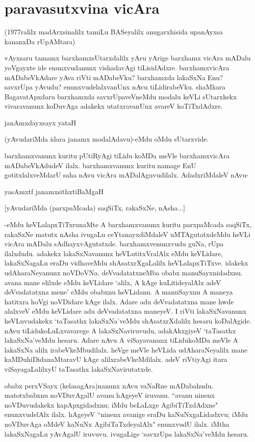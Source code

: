\chapter{paravasutxvina vicAra}\label{chap13}

(1977ralilx madArxsinalilx tamiLu BASeyalilx anugarxhisida upanAyxsa kananxDa rUpAMtara)

vAyxsaru tamamx barxhamxsUtarxdalilx yAru yArige barxhamx vicAra mADalu yoVgayxte ide enunxvudanunx vishadavAgi tiLisidAdxre. barxhamxvicAra mADabeVkAdare yAva riVti mADabeVku? barxhamxda lakaSxNa Enu? savxrUpa yAvudu? enunxvudelalxvanUnx nAvu tiLidirabeVku. shaMkara BagavatApxdaru barxhamxda savxrUpaveVneMdu modalu keVLi sUtarxkekx vivaravanunx koDuvAga adakekx utatxravanUnx avareV koTiTxdAdxre. 

janAmxdayxsayx yataH

(yAvudariMda idara janamx modalAdavu)-eMdu oMdu sUtarxvide. 

barxhamxvanunx kuritu pUtiRyAgi tiLidu koMDa meVle barxhamxvicAra mADabeVkAdudeV ilalx. barxhamxvanunx kuritu namage EnU gotitxlalxveMdarU saha nAvu vicAra mADalAguvudilalx. AdadxriMdaleV nAvu- 

yasAmxtf janamxsithxtiBaMgaH

[yAvudariMda (parxpaMcada) saqSiTx, rakaSxNe, nAsha$\ldots$]

-eMdu heVLalapxTiTxrunaMte A barxhamxvanunx kuritu parxpaMcada saqSiTx, rakaSxNe matutx nAsha ivugaLu ceYtanayxdiMdaleV uMTAgutatxdeMdu heVLi vicAra mADalu sAdhayxvAgutatxde. barxhamxvenunxvudu guNa, rUpa ilalxdudu. adakekx lakaSxNavanunx heVLutitxVralAlx eMdu keVLidare, lakaSxNagaLu eraDu vidhaveMdu shAsatxrXgaLalilx heVLalapxTiTxve. idakekx udAharaNeyanunx noVDoVNa. deVvadatatxneMba obabx manuSayxnidadxnu. avana mane elilxde eMdu keVLidare `alilx, A kAge kuLitideyalAlx adeV deVvadatatxna mene' eMdu obabxnu heVLidanu. A manuSayxnu A maneya hatitxra hoVgi noVDidare kAge ilalx. Adare adu deVvadatatxna mane hwde alalxveV eMdu keVLidare adu deVvadatatxna maneyeV. I riVti lakaSxNavanunx heVLuvudakekx `taTasathx lakaSxNa'veMdu shAsatxrXdalilx hesaru koDalAgide. nAvu tiLidukoLuLxvavarege A lakaSxNaviruvudu, adakAkxgiyeV `taTasathx lakaSxNa'veMdu hesaru. Adare nAvu A viSayavanunx tiLidukoMDa meVle A lakaSxNa alilx irabeVkeMbudilalx. heVge meVle heVLida udAharaNeyalilx mane kaMDuhiDidanaMtaravU kAge alilxrabeVkeMdilalx. adeV riVtiyAgi itara viSayagaLalilxyU taTasathx lakaSxNavirutatxde. 

obabx perxVSayx (kelasagAra)nanunx nAvu vaNaRne mADabahudu. matotxbabxnu noVDuvAgalU avanu hAgeyeV iruvanu. ``avanu ninenx noVDuvudakekx kapApxgidadxnu; iMdu beLaLxge AgibiTiTxdAdxne" enunxvudelAlx ilalx. hAgeyeV ``ninenx avanige eraDu kaNuNxgaLidadxvu; iMdu noVDuvAga oMdeV kaNuNx AgibiTaTxdeyalAlx" enunxvudU ilalx. iMtha lakaSxNagaLu yAvAgalU iruvuvu. ivugaLige `savxrUpa lakaSxNa'veMdu hesaru.

